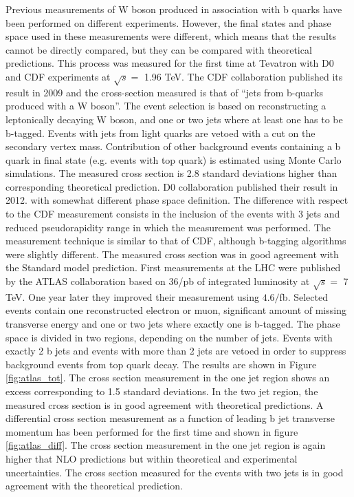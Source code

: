 	Previous measurements of W boson produced in association with b quarks have been performed on different experiments. However, the final states and phase space used in these measurements were different, which means that the results cannot be directly compared, but they can be compared with theoretical predictions. This process was measured for the first time at Tevatron with D0 and CDF experiments at $\sqrt{s} =$ 1.96 TeV. The CDF collaboration published its result in 2009 and the cross-section measured is that of “jets from b-quarks produced with a W boson”\citep{Aaltonen:2009qi}. The event selection is based on reconstructing a leptonically decaying W boson, and one or two jets where at least one has to be b-tagged. Events with jets from light quarks are vetoed with a cut on the secondary vertex mass. Contribution of other background events containing a b quark in final state (e.g. events with top quark) is estimated using Monte Carlo simulations. The measured cross section is 2.8 standard deviations higher than corresponding theoretical prediction. D0 collaboration published their result in 2012. with somewhat different phase space definition\citep{D0:2012qt}. The difference with respect to the CDF measurement consists in the inclusion of the events with 3 jets and reduced pseudorapidity range in which the measurement was performed. The measurement technique is similar to that of CDF, although b-tagging algorithms were slightly different. The measured cross section was in good agreement with the Standard model prediction.
	First measurements at the LHC were published by the ATLAS collaboration based on 36/pb of integrated luminosity at $\sqrt{s} =$ 7 TeV. One year later they improved their measurement using $4.6/$fb.\citep{Aad:2013vka} Selected events contain one reconstructed electron or muon, significant amount of missing transverse energy and one or two jets where exactly one is b-tagged. The phase space is divided in two regions, depending on the number of jets. Events with exactly 2 b jets and events with more than 2 jets are vetoed in order to suppress background events from top quark decay. The results are shown in Figure \ref{fig:atlas_tot}. The cross section measurement in the one jet region shows an excess corresponding to 1.5 standard deviations. In the two jet region, the measured cross section is in good agreement with theoretical predictions. A differential cross section measurement as a function of leading b jet transverse momentum has been performed for the first time and shown in figure \ref{fig:atlas_diff}. The cross section measurement in the one jet region is again higher that NLO predictions but within theoretical and experimental uncertainties. The cross section measured for the events with two jets is in good agreement with the theoretical prediction.
